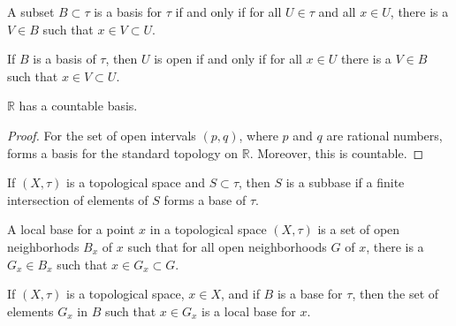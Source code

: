     \begin{theorem}
        A subset $B\subset\tau$ is a basis
        for $\tau$ if and only if for all
        $U\in\tau$ and all $x\in{U}$, there is
        a $V\in{B}$ such that
        $x\in{V}\subset{U}$.
    \end{theorem}
    \begin{theorem}
        If $B$ is a basis of $\tau$, then
        $U$ is open if and only if for all
        $x\in{U}$ there is a $V\in{B}$ such that
        $x\in{V}\subset{U}$.
    \end{theorem}
    \begin{theorem}
        $\mathbb{R}$ has a countable basis.
    \end{theorem}
    \begin{proof}
        For the set of open intervals
        $(p,q)$, where $p$ and $q$ are rational
        numbers, forms a basis for the standard
        topology on $\mathbb{R}$. Moreover, this
        is countable.
    \end{proof}
    \begin{definition}
        If $(X,\tau)$ is a topological space
        and $S\subset\tau$, then $S$ is a subbase
        if a finite intersection of elements of $S$
        forms a base of $\tau$.
    \end{definition}
    \begin{definition}
        A local base for a point
        $x$ in a topological space $(X,\tau)$
        is a set of open neighborhods $B_{x}$ of
        $x$ such that for all open neighborhoods $G$
        of $x$, there is a $G_{x}\in{B_{x}}$ such that
        $x\in{G_{x}}\subset{G}$.
    \end{definition}
    \begin{theorem}
        If $(X,\tau)$ is a topological space, $x\in{X}$,
        and if $B$ is a base for $\tau$, then
        the set of elements $G_{x}$ in $B$ such that
        $x\in{G_{x}}$ is a local base for $x$.
    \end{theorem}